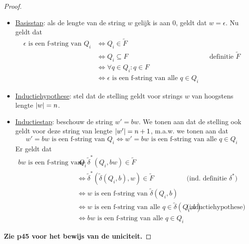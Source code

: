 \documentclass[../aanvullingen_cursus.tex]{subfiles}
\begin{document}
\begin{proof}
	\begin{itemize}
		\item \underline{Basisstap}: als de lengte van de string \(w\) gelijk is aan 0, geldt dat \(w=\epsilon\). Nu geldt dat
		\begin{align*}
				\epsilon \text{ is een f-string van } Q_i &\Leftrightarrow Q_i \in \tilde{F} \\
				&\Leftrightarrow Q_i \subseteq F && \text{definitie } \tilde{F} \\
				&\Leftrightarrow \forall q \in Q_i : q \in F \\
				&\Leftrightarrow \epsilon \text{ is een f-string van alle } q \in Q_i
		\end{align*}
		\item \underline{Inductiehypothese}: stel dat de stelling geldt voor strings \(w\) van hoogstens lengte \(\lvert w \rvert=n\).
		\item \underline{Inductiestap}: beschouw de string \(w'=bw\). We tonen aan dat de stelling ook geldt voor deze string van lengte \(\lvert w' \rvert=n+1\), m.a.w. we tonen aan dat \[w'=bw \text{ is een f-string van } Q_i \Leftrightarrow w'=bw \text{ is een f-string van alle } q\in Q_i \]Er geldt dat
		\begin{align*}
			bw \text{ is een f-string van } Q_i &\Leftrightarrow \tilde{\delta}^*(Q_i,bw) \in \tilde{F} \\
			&\Leftrightarrow \tilde{\delta}^*\left(\tilde{\delta}(Q_i,b),w\right) \in \tilde{F} && \text{(ind. definitie } \delta^*\text{)} \\
			&\Leftrightarrow w \text{ is een f-string van } \tilde{\delta}(Q_i,b)\\
			&\Leftrightarrow w \text{ is een f-string van alle } q \in \tilde{\delta}(Q_i,b) && \text{(inductiehypothese)} \\
			&\Leftrightarrow bw \text{ is een f-string van alle } q \in Q_i
		\end{align*}
	\end{itemize}

	\textbf{Zie p45 voor het bewijs van de uniciteit.}

\end{proof}
\end{document}
